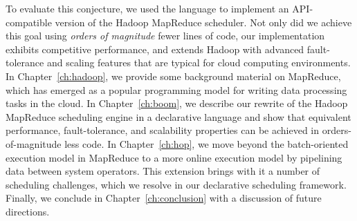 To evaluate this conjecture, we used the \OVERLOG language to implement an
API-compatible version of the Hadoop MapReduce scheduler.  Not only did we
achieve this goal using {\em orders of magnitude} fewer lines of code, our
implementation exhibits competitive performance, and extends Hadoop with
advanced fault-tolerance and scaling features that are typical for cloud
computing environments.  In Chapter~\ref{ch:hadoop}, we provide some background
material on MapReduce, which has emerged as a popular programming model for
writing data processing tasks in the cloud.  In Chapter~\ref{ch:boom}, we describe
our rewrite of the Hadoop MapReduce scheduling engine in a declarative language
and show that equivalent performance, fault-tolerance, and scalability
properties can be achieved in orders-of-magnitude less code.  In
Chapter~\ref{ch:hop}, we move beyond the batch-oriented execution model in
MapReduce to a more online execution model by pipelining data between system
operators.  This extension brings with it a number of scheduling challenges,
which we resolve in our declarative scheduling framework.  Finally, we conclude
in Chapter~\ref{ch:conclusion} with a discussion of future directions.




